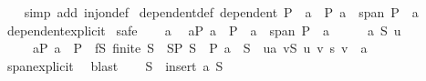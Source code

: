 \begin{isabellebody}
%
\isadelimproof
\ \ %
\endisadelimproof
%
\isatagproof
{}\isamarkupfalse%
\ {\isacharparenleft}{\kern0pt}simp\ add{\isacharcolon}{\kern0pt}\ inj{\isacharunderscore}{\kern0pt}on{\isacharunderscore}{\kern0pt}def{\isacharparenright}{\kern0pt}%
\endisatagproof
{\isafoldproof}%
%
\isadelimproof
\isanewline
%
\endisadelimproof
\isanewline
{}\isamarkupfalse%
\ dependent{\isacharunderscore}{\kern0pt}def{\isacharcolon}{\kern0pt}\ {\isachardoublequoteopen}dependent\ P\ {\isasymlongleftrightarrow}\ {\isacharparenleft}{\kern0pt}{\isasymexists}a\ {\isasymin}\ P{\isachardot}{\kern0pt}\ a\ {\isasymin}\ span\ {\isacharparenleft}{\kern0pt}P\ {\isacharminus}{\kern0pt}\ {\isacharbraceleft}{\kern0pt}a{\isacharbraceright}{\kern0pt}{\isacharparenright}{\kern0pt}{\isacharparenright}{\kern0pt}{\isachardoublequoteclose}\isanewline
%
\isadelimproof
\ \ %
\endisadelimproof
%
\isatagproof
{}\isamarkupfalse%
\ dependent{\isacharunderscore}{\kern0pt}explicit\isanewline
{}\isamarkupfalse%
\ safe\isanewline
\ \ \isamarkupfalse%
\ a\ \isamarkupfalse%
\ aP{\isacharcolon}{\kern0pt}\ {\isachardoublequoteopen}a\ {\isasymin}\ P{\isachardoublequoteclose}\ \ {\isachardoublequoteopen}a\ {\isasymin}\ span\ {\isacharparenleft}{\kern0pt}P\ {\isacharminus}{\kern0pt}\ {\isacharbraceleft}{\kern0pt}a{\isacharbraceright}{\kern0pt}{\isacharparenright}{\kern0pt}{\isachardoublequoteclose}\isanewline
\ \ \isamarkupfalse%
\ \isamarkupfalse%
\ a\ S\ u\isanewline
\ \ \ \ \ aP{\isacharcolon}{\kern0pt}\ {\isachardoublequoteopen}a\ {\isasymin}\ P{\isachardoublequoteclose}\ \ fS{\isacharcolon}{\kern0pt}\ {\isachardoublequoteopen}finite\ S{\isachardoublequoteclose}\ \ SP{\isacharcolon}{\kern0pt}\ {\isachardoublequoteopen}S\ {\isasymsubseteq}\ P{\isachardoublequoteclose}\ {\isachardoublequoteopen}a\ {\isasymnotin}\ S{\isachardoublequoteclose}\ \ ua{\isacharcolon}{\kern0pt}\ {\isachardoublequoteopen}{\isacharparenleft}{\kern0pt}{\isasymSum}v{\isasymin}S{\isachardot}{\kern0pt}\ u\ v\ {\isacharasterisk}{\kern0pt}s\ v{\isacharparenright}{\kern0pt}\ {\isacharequal}{\kern0pt}\ a{\isachardoublequoteclose}\isanewline
\ \ \ \ \isamarkupfalse%
\ span{\isacharunderscore}{\kern0pt}explicit\ \isamarkupfalse%
\ blast\isanewline
\ \ \isamarkupfalse%
\ {\isacharquery}{\kern0pt}S\ {\isacharequal}{\kern0pt}\ {\isachardoublequoteopen}insert\ a\ S{\isachardoublequoteclose}\isanewline

\end{isabellebody}

